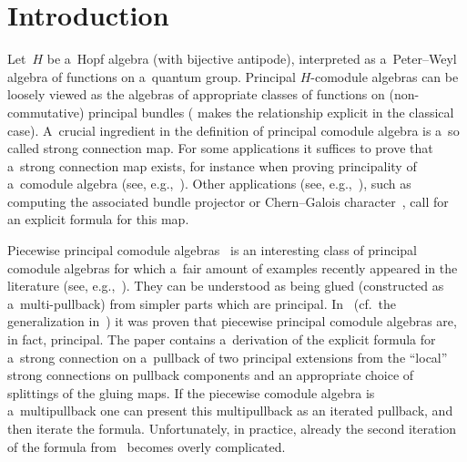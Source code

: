 \documentclass[pdftex]{sigma}
\begin{document}


\renewcommand{\thefootnote}{\arabic{footnote}}
\setcounter{footnote}{0}

\vspace{-2mm}

\section{Introduction}

Let~$H$ be a~Hopf algebra (with bijective antipode), interpreted as a~Peter--Weyl algebra of functions on a~quantum
group.
Principal $H$-comodule algebras can be loosely viewed as the algebras of appropriate classes of functions on
(non-commutative) principal bundles (\cite{bhms06} makes the relationship explicit in the classical case).
A~crucial ingredient in the def\/inition of principal comodule algebra is a~so called strong connection map.
For some applications it suf\/f\/ices to prove that a~strong connection map exists, for instance when proving principality
of a~comodule algebra (see, e.g.,~\cite{reduct}).
Other applications (see, e.g.,~\cite{bf,hms03, hms2, haj-wagn}), such as computing the associated bundle projector or
Chern--Galois character~\cite{bh04}, call for an explicit formula for this map.

Piecewise principal comodule algebras~\cite{cm2002,hkmz11} is an interesting class of principal comodule algebras for
which a~fair amount of examples recently appeared in the literature (see,
e.g.,~\cite{bhms,bf14,cp14,index-pair,hms2,hms,Rennie,reduct,haj-wagn}).
They can be understood as being glued (constructed as a~multi-pullback) from simpler parts which are principal.
In~\cite{hkmz11} (cf.~the generalization in~\cite{haj-wagn}) it was proven that piecewise principal comodule algebras
are, in fact, principal.
The paper contains a~derivation of the explicit formula for a~strong connection on a~pullback of two principal
extensions from the ``local'' strong connections on pullback components and an appropriate choice of splittings of the
gluing maps.
If the piecewise comodule algebra is a~multipullback one can present this multipullback as an iterated pullback, and
then iterate the formula.
Unfortunately, in practice, already the second iteration of the formula from~\cite{hkmz11} becomes overly complicated.
\end{document}
